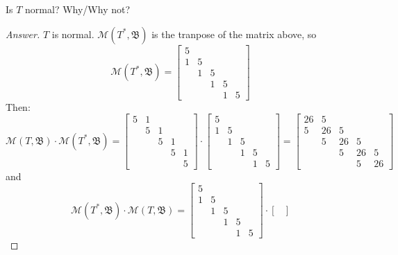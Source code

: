 \documentclass{article}
\newcommand{\parens}[1]{\left(#1\right)}
\newcommand{\sqbracks}[1]{\left[#1\right]}
\begin{document}
        \item Is $T$ normal? Why/Why not?
        \begin{proof}[Answer]
        $T$ is normal. $\mathcal{M}\parens{T^*, \mathfrak{B}}$ is the tranpose of the 
        matrix above, so 
        $$\mathcal{M}\parens{T^*, \mathfrak{B}} = \sqbracks{
        \begin{matrix}
        5 & & & & \\
        1 & 5 & & & \\
        & 1 & 5 & & \\
        & & 1 & 5 &  \\
        & & & 1 & 5
        \end{matrix}}$$
        Then:
        $$\mathcal{M}\parens{T, \mathfrak{B}}\cdot \mathcal{M}\parens{T^*, \mathfrak{B}} = 
        \sqbracks{\begin{matrix}
        5 & 1 & & & \\
        & 5 & 1 & & \\
        & & 5 & 1 & \\
        & & & 5 & 1 \\
        & & & & 5 
        \end{matrix}}\cdot \sqbracks{
        \begin{matrix}
        5 & & & & \\
        1 & 5 & & & \\
        & 1 & 5 & & \\
        & & 1 & 5 &  \\
        & & & 1 & 5
        \end{matrix}} = \sqbracks{
        \begin{matrix}
        26 & 5 & & & \\
        5 & 26 & 5 & & \\
        & 5 & 26 & 5 & \\
        & & 5 & 26 & 5 \\
        & & & 5 & 26
        \end{matrix}}$$
        and 
        $$\mathcal{M}\parens{T^*, \mathfrak{B}}\cdot\mathcal{M}\parens{T, \mathfrak{B}} = 
        \sqbracks{
        \begin{matrix}
        5 & & & & \\
        1 & 5 & & & \\
        & 1 & 5 & & \\
        & & 1 & 5 &  \\
        & & & 1 & 5
        \end{matrix}} \cdot \sqbracks{\begin{matrix}

\end{matrix}}$$
\end{proof}
\end{document}

